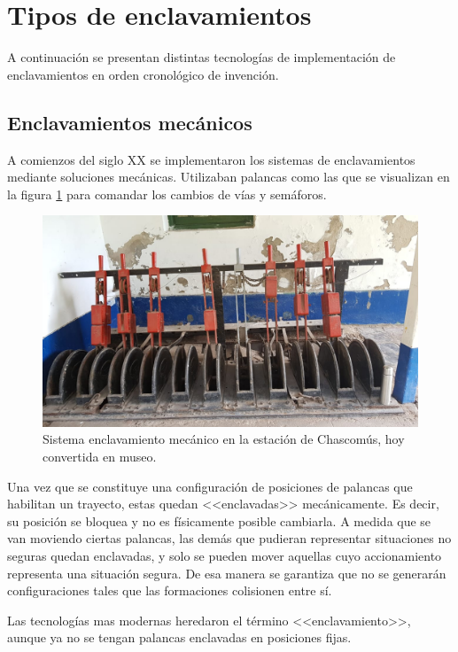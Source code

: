 	\section{Tipos de enclavamientos}
		
		A continuación se presentan distintas tecnologías de implementación de enclavamientos en orden cronológico de invención.
		
		\subsection{Enclavamientos mecánicos}
			
			A comienzos del siglo XX se implementaron los sistemas de enclavamientos mediante soluciones mecánicas. Utilizaban palancas como las que se visualizan en la figura \ref{fig:Mecanico} para comandar los cambios de vías y semáforos.
	
			\begin{figure}[htbp!]
				\centering
				\includegraphics[scale=.27]{./Figures/Mecanico}
				\caption{Sistema enclavamiento mecánico en la estación de Chascomús, hoy convertida en museo.}
				\label{fig:Mecanico}
			\end{figure}

			Una vez que se constituye una configuración de posiciones de palancas que habilitan un trayecto, estas quedan <<enclavadas>> mecánicamente. Es decir, su posición se bloquea y no es físicamente posible cambiarla. A medida que se van moviendo ciertas palancas, las demás que pudieran representar situaciones no seguras quedan enclavadas, y solo se pueden mover aquellas cuyo accionamiento representa una situación segura. De esa manera se garantiza que no se generarán configuraciones tales que las formaciones colisionen entre sí.
			
			Las tecnologías mas modernas heredaron el término <<enclavamiento>>, aunque ya no se tengan palancas enclavadas en posiciones fijas.
		
